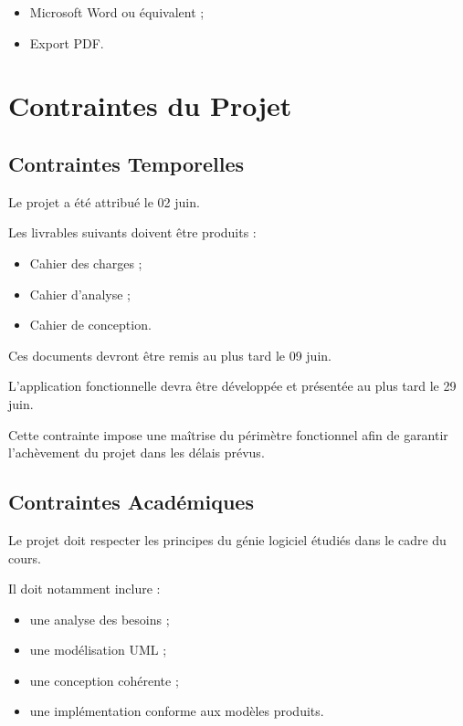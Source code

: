 \documentclass[12pt,a4paper]{report}
\begin{document}
\begin{itemize}
\item
  Microsoft Word ou équivalent ;
\item
  Export PDF.
\end{itemize}

\section{Contraintes du Projet}\label{contraintes-du-projet}

\subsection{Contraintes Temporelles}\label{contraintes-temporelles}

Le projet a été attribué le 02 juin.

Les livrables suivants doivent être produits :

\begin{itemize}
\item
  Cahier des charges ;
\item
  Cahier d'analyse ;
\item
  Cahier de conception.
\end{itemize}

Ces documents devront être remis au plus tard le 09 juin.

L'application fonctionnelle devra être développée et présentée au plus
tard le 29 juin.

Cette contrainte impose une maîtrise du périmètre fonctionnel afin de
garantir l'achèvement du projet dans les délais prévus.

\subsection{Contraintes Académiques}\label{contraintes-acaduxe9miques}

Le projet doit respecter les principes du génie logiciel étudiés dans le
cadre du cours.

Il doit notamment inclure :

\begin{itemize}
\item
  une analyse des besoins ;
\item
  une modélisation UML ;
\item
  une conception cohérente ;
\item
  une implémentation conforme aux modèles produits.
\end{itemize}
\end{document}
